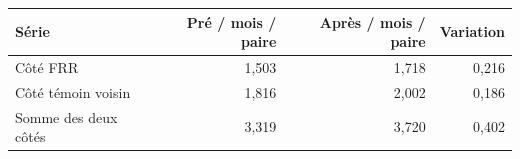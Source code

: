 \begin{tabularx}{\linewidth}{Xrrr}
\toprule
Série & Pré / mois / paire & Après / mois / paire & Variation \\
\midrule
Côté FRR & 1,503 & 1,718 & 0,216 \\
Côté témoin voisin & 1,816 & 2,002 & 0,186 \\
Somme des deux côtés & 3,319 & 3,720 & 0,402 \\
\bottomrule
\end{tabularx}
